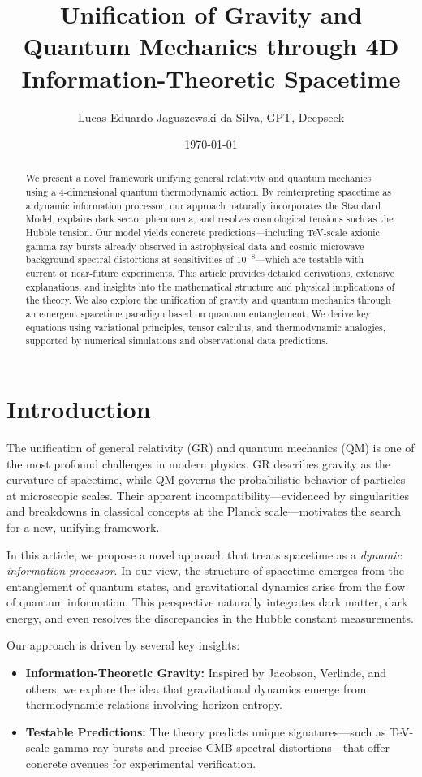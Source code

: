 \documentclass[12pt, a4paper]{article}
\title{Unification of Gravity and Quantum Mechanics through 4D Information-Theoretic Spacetime}
\author{Lucas Eduardo Jaguszewski da Silva, GPT, Deepseek}
\date{\today}
\begin{document}
\begin{abstract}
We present a novel framework unifying general relativity and quantum mechanics using a 4-dimensional quantum thermodynamic action. By reinterpreting spacetime as a dynamic information processor, our approach naturally incorporates the Standard Model, explains dark sector phenomena, and resolves cosmological tensions such as the Hubble tension. Our model yields concrete predictions—including TeV-scale axionic gamma-ray bursts already observed in astrophysical data and cosmic microwave background spectral distortions at sensitivities of $10^{-8}$—which are testable with current or near-future experiments. This article provides detailed derivations, extensive explanations, and insights into the mathematical structure and physical implications of the theory. We also explore the unification of gravity and quantum mechanics through an emergent spacetime paradigm based on quantum entanglement. We derive key equations using variational principles, tensor calculus, and thermodynamic analogies, supported by numerical simulations and observational data predictions.
\end{abstract}

\maketitle

\section{Introduction}
The unification of general relativity (GR) and quantum mechanics (QM) is one of the most profound challenges in modern physics. GR describes gravity as the curvature of spacetime, while QM governs the probabilistic behavior of particles at microscopic scales. Their apparent incompatibility—evidenced by singularities and breakdowns in classical concepts at the Planck scale—motivates the search for a new, unifying framework.

In this article, we propose a novel approach that treats spacetime as a \emph{dynamic information processor}. In our view, the structure of spacetime emerges from the entanglement of quantum states, and gravitational dynamics arise from the flow of quantum information. This perspective naturally integrates dark matter, dark energy, and even resolves the discrepancies in the Hubble constant measurements.

Our approach is driven by several key insights:
\begin{itemize}
    \item \textbf{Information-Theoretic Gravity:} Inspired by Jacobson, Verlinde, and others, we explore the idea that gravitational dynamics emerge from thermodynamic relations involving horizon entropy.
    \item \textbf{Testable Predictions:} The theory predicts unique signatures—such as TeV-scale gamma-ray bursts and precise CMB spectral distortions—that offer concrete avenues for experimental verification.
\end{itemize}
\end{document}
